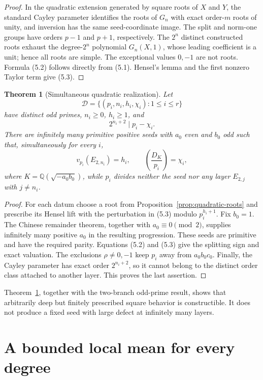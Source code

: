\documentclass[11pt]{article}
\newtheorem{theorem}{Theorem}
\theoremstyle{definition}
\theoremstyle{remark}
\begin{document}
\begin{proof}
In the quadratic extension generated by square roots of $X$ and $Y$,
the standard Cayley parameter identifies the roots of $G_n$ with exact
order-$m$ roots of unity, and inversion has the same seed-coordinate
image.  The split and norm-one groups have orders $p-1$ and $p+1$,
respectively.  The \(2^n\) distinct constructed roots exhaust the
degree-\(2^n\) polynomial \(G_n(X,1)\), whose leading coefficient is a
unit; hence all roots are simple.  The exceptional values \(0,-1\) are not
roots.  Formula (5.2) follows directly from (5.1).  Hensel's lemma and the
first nonzero Taylor term give (5.3).
\end{proof}

\begin{theorem}[Simultaneous quadratic realization]\label{thm:quadratic-realization}
Let
\[
 \mathcal D=\{(p_i,n_i,h_i,\chi_i):1\le i\le r\}
\]
have distinct odd primes, $n_i\ge0$, $h_i\ge1$, and
\[
 2^{n_i+2}\mid p_i-\chi_i.
\]
There are infinitely many primitive positive seeds with $a_0$ even and
$b_0$ odd such that, simultaneously for every $i$,
\[
 v_{p_i}(E_{2,n_i})=h_i,
 \qquad
 \left(\frac{D_K}{p_i}\right)=\chi_i,
 \tag{5.4}
\]
where \(K=\mathbb Q(\sqrt{-a_0b_0})\), while $p_i$ divides neither the
seed nor any layer $E_{2,j}$ with $j\ne n_i$.
\end{theorem}

\begin{proof}
For each datum choose a root from Proposition~\ref{prop:quadratic-roots}
and prescribe its Hensel lift with the perturbation in (5.3) modulo
\(p_i^{h_i+1}\).  Fix $b_0=1$.  The Chinese remainder theorem, together
with \(a_0\equiv0\pmod2\), supplies infinitely many positive $a_0$ in
the resulting progression.  These seeds are primitive and have the
required parity.  Equations (5.2) and (5.3) give the splitting sign and
exact valuation.  The exclusions \(\rho\ne0,-1\) keep $p_i$ away from
\(a_0b_0c_0\).  Finally, the Cayley parameter has exact order
\(2^{n_i+2}\), so it cannot belong to the distinct order class attached to
another layer.  This proves the last assertion.
\end{proof}

Theorem~\ref{thm:quadratic-realization}, together with the two-branch
odd-prime result, shows that arbitrarily deep but finitely prescribed
square behavior is constructible.  It does not produce a fixed seed with
large defect at infinitely many layers.

\section{A bounded local mean for every degree}
\end{document}
